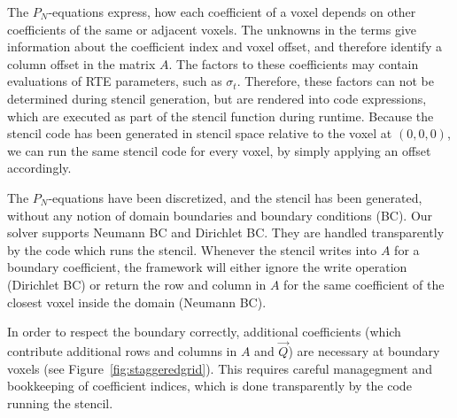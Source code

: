 The $P_N$-equations express, how each coefficient of a voxel depends on other coefficients of the same or adjacent voxels. The unknowns in the terms give information about the coefficient index and voxel offset, and therefore identify a column offset in the matrix $A$. The factors to these coefficients may contain evaluations of RTE parameters, such as $\sigma_t$. Therefore, these factors can not be determined during stencil generation, but are rendered into code expressions, which are executed as part of the stencil function during runtime. Because the stencil code has been generated in stencil space relative to the voxel at $(0,0,0)$, we can run the same stencil code for every voxel, by simply applying an offset accordingly. 

The $P_N$-equations have been discretized, and the stencil has been generated, without any notion of domain boundaries and boundary conditions (BC). Our solver supports Neumann BC and Dirichlet BC. They are handled transparently by the code which runs the stencil. Whenever the stencil writes into $A$ for a boundary coefficient, the framework will either ignore the write operation (Dirichlet BC) or return the row and column in $A$ for the same coefficient of the closest voxel inside the domain (Neumann BC).

In order to respect the boundary correctly, additional coefficients (which contribute additional rows and columns in $A$ and $\vec{Q}$) are necessary at boundary voxels (see Figure~\ref{fig:staggeredgrid}). This requires careful managegment and bookkeeping of coefficient indices, which is done transparently by the code running the stencil.


\begin{figure}[h]
\centering
\begin{subfigure}{0.45\columnwidth}
\end{subfigure}%
\hspace{0.05\columnwidth}
\begin{subfigure}{0.45\columnwidth}
\end{subfigure}%
\vspace{-0.2in}
\label{fig:artefacts}
\end{figure}




